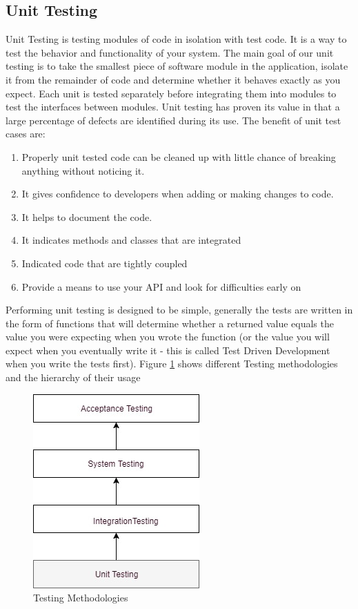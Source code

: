 \documentclass[article,type=msc,colorback,accentcolor=tud9c,twoside,11pt]{tudthesis}
\begin{document}
\subsection{Unit Testing}
Unit Testing\cite{EffectivnessofUnitTest} is testing modules of code in isolation with test code. It is a way to test the behavior and functionality of your system. The main goal of our unit testing is to take the smallest piece of software module in the application, isolate it from the remainder of code and determine whether it behaves exactly as you expect. Each unit is tested separately before integrating them into modules to test the interfaces between modules. Unit testing has proven its value in that a large percentage of defects are identified during its use. The benefit of unit test cases are:
\begin{enumerate}
	\item Properly unit tested code can be cleaned up with little chance of breaking anything without noticing it.
	\item It gives confidence to developers when adding or making changes to code.
	\item It helps to document the code.
	\item It indicates methods and classes that are integrated 
	\item Indicated code that are tightly coupled
	\item Provide a means to use your API and look for difficulties early on 
\end{enumerate}
Performing unit testing is designed to be simple, generally the tests are written in the form of functions that will determine whether a returned value equals the value you were expecting when you wrote the function (or the value you will expect when you eventually write it - this is called Test Driven Development when you write the tests first). Figure \ref{fig:Testingmethodologies} shows different Testing methodologies and the hierarchy of their usage
\begin{figure}[h]
	\centering
	\includegraphics[scale=0.7]{Testing.jpg}
	\caption{Testing Methodologies}
	\label{fig:Testingmethodologies}
\end{figure}
\end{document}
